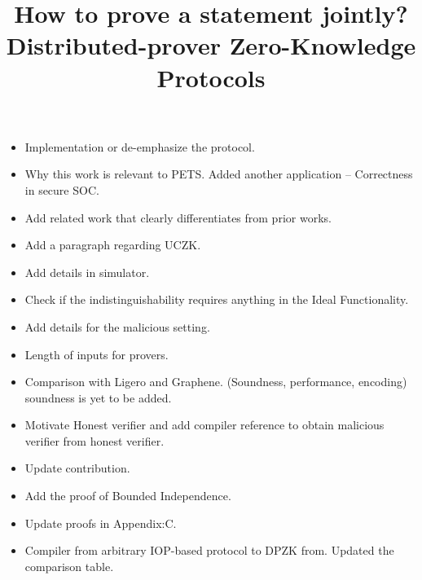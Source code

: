 \documentclass[USenglish,oneside,twocolumn]{article}
\begin{document}
 

%
%
%
%
%
%
%

  \title{\huge How to prove a statement jointly?  Distributed-prover Zero-Knowledge Protocols}





%
 

\maketitle
\begin{itemize}
	\item Implementation or de-emphasize the protocol.
	\item Why this work is relevant to PETS.
	{\color{blue} Added another application -- Correctness in secure SOC.}
	\item Add related work that clearly differentiates from prior works.
	\item Add a paragraph regarding  UCZK.
	\item {\color{blue}Add details in simulator.}
	\item Check if the indistinguishability requires anything in the Ideal Functionality.
	\item {\color{blue}Add details for the malicious setting.}
	\item {\color{blue}Length of inputs for provers.}
	\item {\color{blue}Comparison with Ligero and Graphene. (Soundness, performance, encoding)} soundness is yet to be added.
	\item Motivate Honest verifier and add compiler reference to obtain malicious verifier from honest verifier.
	\item {\color{blue}Update contribution.}
	\item {\color{blue}Add the proof of Bounded Independence.}
	\item {\color{blue}Update proofs in Appendix:C.}
	\item {\color{blue}Compiler from arbitrary IOP-based protocol to DPZK from. Updated the comparison table.}
\end{itemize}
\end{document}
